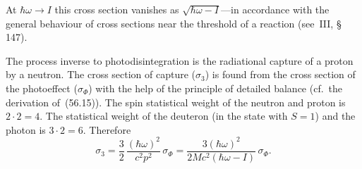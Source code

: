 At $\hbar\omega \to I$ this cross section vanishes as $\sqrt{\hbar\omega - I}$---in accordance with the general behaviour of cross sections near the threshold of a reaction (see~III, \S\,147).

The process inverse to photodisintegration is the radiational capture of a proton by a neutron. The cross section of capture ($\sigma_3$) is found from the cross section of the photoeffect ($\sigma_\Phi$) with the help of the principle of detailed balance (cf.\ the derivation of~(56.15)). The spin statistical weight of the neutron and proton is $2 \cdot 2 = 4$. The statistical weight of the deuteron (in the state with $S = 1$) and the photon is $3 \cdot 2 = 6$. Therefore
\begin{equation}
\sigma_3 = \frac{3}{2}\,\frac{(\hbar\omega)^2}{c^2p^2}\,\sigma_\Phi = \frac{3(\hbar\omega)^2}{2Mc^2(\hbar\omega - I)}\,\sigma_\Phi.
\tag{58.8}
\end{equation}
